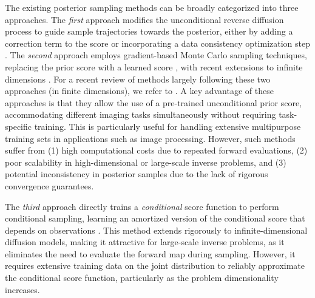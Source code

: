 \documentclass[10pt]{article} %
\theoremstyle{plain}
\theoremstyle{definition}
\theoremstyle{remark}
\newcommand{\duclam}[1]{#1}%
\begin{document}
The existing posterior sampling methods can be broadly categorized into three approaches. The \emph{first} approach modifies the unconditional reverse diffusion process to guide sample trajectories towards the posterior, either by adding a correction term to the score \cite{jalal2021robustannealedlangevian, chung2023diffusion, song2023pseudoinverseguided, Adam2022Posteriorsamples, CHUNG2022102479, levac2023mri} or incorporating a data consistency optimization step \cite{song2022solving, Dey_2024, Chung2022ComeCloser}.
The \emph{second} approach employs gradient-based Monte Carlo sampling techniques, replacing the prior score with a learned score \cite{cardoso2023monte, sun2023provable, feng2023scorebased}, with recent extensions to infinite dimensions \cite{baldassari2024taming}. \duclam{For a recent review of methods largely following these two approaches (in finite dimensions), we refer to \citet{daras2024survey}.} A key advantage of these approaches is that they allow the use of a pre-trained unconditional prior score, accommodating different imaging tasks simultaneously without requiring task-specific training. This is particularly useful for handling extensive multipurpose training sets in applications such as image processing. However, such methods suffer from (1) high computational costs due to repeated forward evaluations, (2) poor scalability in high-dimensional or large-scale inverse problems, and (3) potential inconsistency in posterior samples due to the lack of rigorous convergence guarantees.

The \emph{third} approach directly trains a \emph{conditional} score function to perform conditional sampling, learning an amortized version of the conditional score that depends on observations \cite{baldassari2024conditional, batzolis2021conditional}. This method extends rigorously to infinite-dimensional diffusion models, making it attractive for large-scale inverse problems, as it eliminates the need to evaluate the forward map during sampling. However, it requires extensive training data on the joint distribution to reliably approximate the conditional score function, particularly as the problem dimensionality increases.

\end{document}
